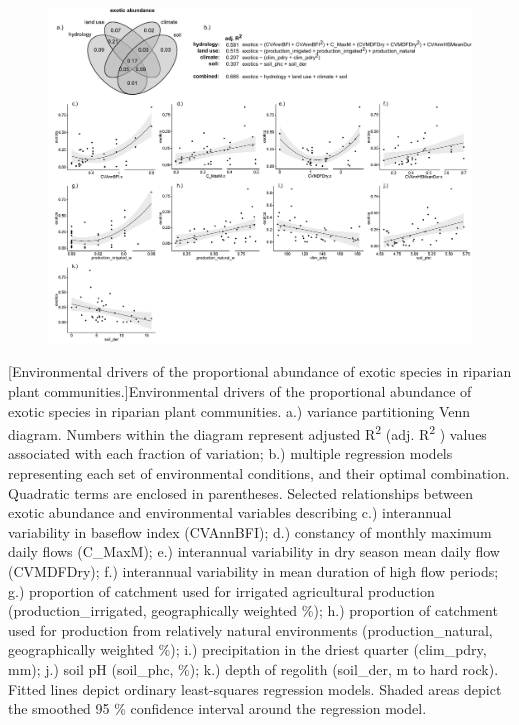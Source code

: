 \documentclass[openright,12pt,a4paper]{memoir}
\begin{document}
\begin{landscape}
\begin{figure}[ht]
\centering
\includegraphics[height = \textheight]{Ch4exotics.pdf} %
\end{figure}
\clearpage %
\end{landscape}
\begingroup
{}[Environmental drivers of the proportional abundance of exotic species in riparian plant communities.]{\small{Environmental drivers of the proportional abundance of exotic species in riparian plant communities. a.) variance partitioning Venn diagram. Numbers within the diagram represent adjusted R\textsuperscript{2}  (adj. R\textsuperscript{2} ) values associated with each fraction of variation; b.) multiple regression models representing each set of environmental conditions, and their optimal combination. Quadratic terms are enclosed in parentheses. Selected relationships between exotic abundance and environmental variables describing c.) interannual variability in baseflow index (CVAnnBFI); d.) constancy of monthly maximum daily flows (C\_MaxM); e.) interannual variability in dry season mean daily flow (CVMDFDry); f.) interannual variability in mean duration of high flow periods; g.) proportion of catchment used for irrigated agricultural production (production\_irrigated, geographically weighted \%); h.) proportion of catchment used for production from relatively natural environments (production\_natural, geographically weighted \%); i.) precipitation in the driest quarter (clim\_pdry, mm); j.) soil pH (soil\_phc, \%); k.) depth of regolith (soil\_der, m to hard rock). Fitted lines depict ordinary least-squares regression models. Shaded areas depict the smoothed 95 \% confidence interval around the regression model.}}
\label{fig:Ch4_F5} %
\endgroup
\clearpage
\end{document}
